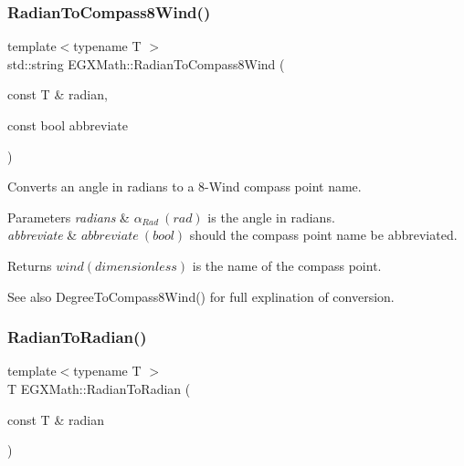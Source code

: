 \subsubsection{\texorpdfstring{Radian\+To\+Compass8\+Wind()}{RadianToCompass8Wind()}}
{\footnotesize\ttfamily template$<$typename T $>$ \\
std\+::string E\+G\+X\+Math\+::\+Radian\+To\+Compass8\+Wind (\begin{DoxyParamCaption}\item[{const T \&}]{radian,  }\item[{const bool}]{abbreviate }\end{DoxyParamCaption})}



Converts an angle in radians to a 8-\/\+Wind compass point name. 


\begin{DoxyParams}{Parameters}
{\em radians} & $\alpha_{Rad}\ (rad)$ is the angle in radians. \\
\hline
{\em abbreviate} & $abbreviate\ (bool)$ should the compass point name be abbreviated. \\
\hline
\end{DoxyParams}
\begin{DoxyReturn}{Returns}
$wind (dimensionless)$ is the name of the compass point. 
\end{DoxyReturn}
\begin{DoxySeeAlso}{See also}
Degree\+To\+Compass8\+Wind() for full explination of conversion. 
\end{DoxySeeAlso}
\mbox{\label{group___e_g_x_math-_angle_conversions_gae08681bd86b8e7e4325f6c8cb3a0dc37}} 
\subsubsection{\texorpdfstring{Radian\+To\+Radian()}{RadianToRadian()}}
{\footnotesize\ttfamily template$<$typename T $>$ \\
T E\+G\+X\+Math\+::\+Radian\+To\+Radian (\begin{DoxyParamCaption}\item[{const T \&}]{radian }\end{DoxyParamCaption})}



